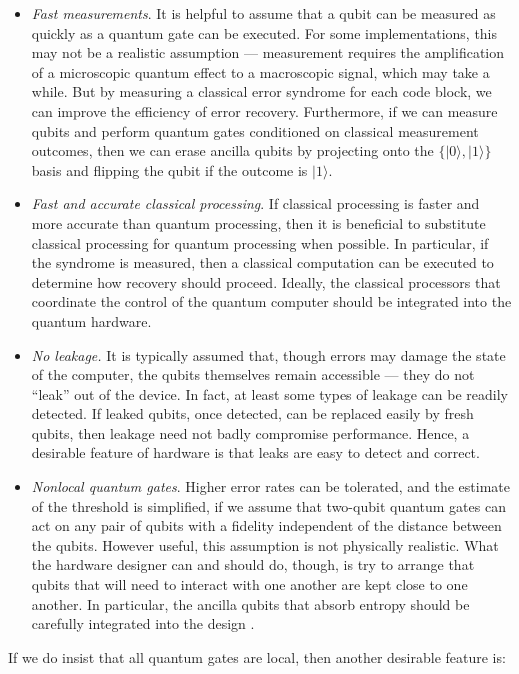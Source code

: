 \begin{itemize}
\item {\em Fast measurements}. It is helpful to assume that a qubit can be measured as quickly as a quantum gate can be executed. For some implementations, this may not be a realistic assumption --- measurement requires the amplification of a microscopic quantum effect to a macroscopic signal, which may take a while. But by measuring a classical error syndrome for each code block, we can improve the efficiency of error recovery. Furthermore, if we can measure qubits and perform quantum gates conditioned on classical measurement outcomes, then we can erase ancilla qubits by projecting onto the $\{|0\rangle,|1\rangle\}$ basis and flipping the qubit if the outcome is $|1\rangle$.
\item {\em Fast and accurate classical processing}. If classical processing is faster and more accurate than quantum processing, then it is beneficial to substitute classical processing for quantum processing when possible. In particular, if the syndrome is measured, then a classical computation can be executed to determine how recovery should proceed. Ideally, the classical processors that coordinate the control of the quantum computer should be integrated into the quantum hardware.
\item {\em No leakage.} It is typically assumed that, though errors may damage the state of the computer, the qubits themselves remain accessible --- they do not ``leak'' out of the device. In fact, at least some types of leakage can be readily detected. If leaked qubits, once detected, can be replaced easily by fresh qubits, then leakage need not badly compromise performance. Hence, a desirable feature of hardware is that leaks are easy to detect and correct.
\item {\em Nonlocal quantum gates}. Higher error rates can be tolerated, and the estimate of the threshold is simplified, if we assume that two-qubit quantum gates can act on any pair of qubits with a fidelity independent of the distance between the qubits. However useful, this assumption is not physically realistic. What the hardware designer can and should do, though, is try to arrange that qubits that will need to interact with one another are kept close to one another. In particular, the ancilla qubits that absorb entropy should be carefully integrated into the design \cite{gottesman_local}.
\end{itemize}

If we do insist that all quantum gates are local, then another desirable feature is:

